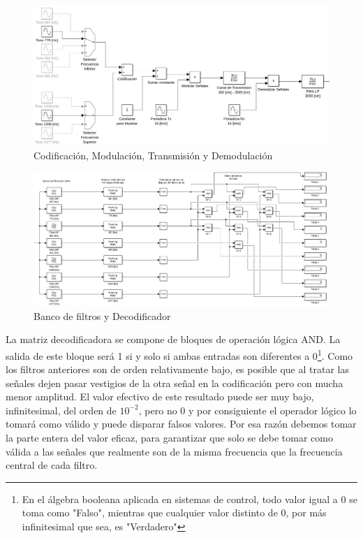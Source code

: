 \begin{figure}[!htb]
  \centering
  \includegraphics[width=\linewidth]{images/desarrollo/modem.png}
  \caption{Codificación, Modulación, Transmisión y Demodulación}
  \label{fig:bloques_modem}
\end{figure}

\begin{figure}[!htb]
  \centering
  \includegraphics[width=\linewidth]{images/desarrollo/codec.png}
  \caption{Banco de filtros y Decodificador}
  \label{fig:bloques_codec}
\end{figure}

La matriz decodificadora se compone de bloques de operación lógica AND. La salida de este bloque será 1 si y solo si ambas entradas son diferentes a 0\footnote{En el álgebra booleana aplicada en sistemas de control, todo valor igual a 0 se toma como "Falso", mientras que cualquier valor distinto de 0, por más infinitesimal que sea, es "Verdadero"}. Como los filtros anteriores son de orden relativamente bajo, es posible que al tratar las señales dejen pasar vestigios de la otra señal en la codificación pero con mucha menor amplitud. El valor efectivo de este resultado puede ser muy bajo, infinitesimal, del orden de $10^{-2}$, pero no 0 y por consiguiente el operador lógico lo tomará como válido y puede disparar falsos valores. Por esa razón debemos tomar la parte entera del valor eficaz, para garantizar que solo se debe tomar como válida a las señales que realmente son de la misma frecuencia que la frecuencia central de cada filtro.

